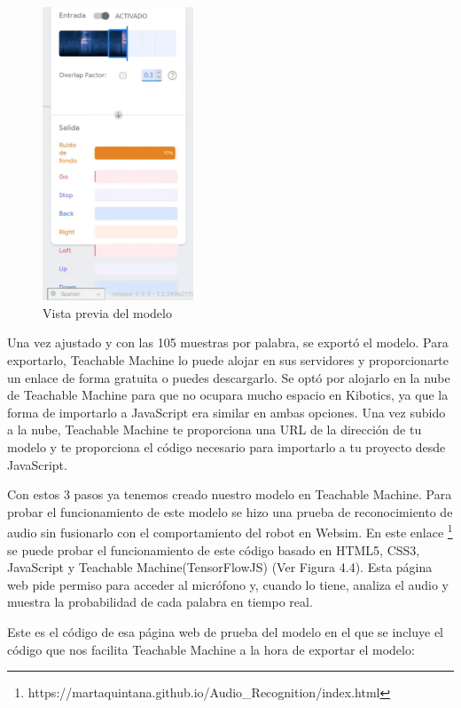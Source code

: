\begin{itemize}
\begin{figure}[H]
 \centering
    \includegraphics[width=0.4\textwidth, height=0.6\textwidth]{chapters/images/teachablemachine2.png}
    \caption{Vista previa del modelo}
\end{figure}
 

Una vez ajustado y con las 105 muestras por palabra, se exportó el modelo. 
Para exportarlo, Teachable Machine lo puede alojar en sus servidores y proporcionarte  un enlace de forma gratuita o puedes descargarlo. Se optó por alojarlo en la nube de Teachable Machine para que no ocupara mucho espacio en Kibotics, ya que la forma de importarlo  a JavaScript era similar en ambas opciones.
Una vez subido a la nube, Teachable Machine te proporciona una URL de la dirección de tu modelo y  te proporciona el código necesario para importarlo a tu proyecto desde JavaScript.
\end{itemize}

Con estos 3 pasos ya tenemos creado nuestro modelo en Teachable Machine. Para probar el funcionamiento de este modelo se hizo una prueba de reconocimiento de audio sin fusionarlo con el comportamiento del robot en Websim. En este enlace \footnote{https://martaquintana.github.io/Audio\_Recognition/index.html} se puede probar el funcionamiento de este código basado en HTML5, CSS3, JavaScript y Teachable Machine(TensorFlowJS) (Ver Figura 4.4). Esta página web pide permiso para acceder al micrófono y, cuando lo tiene, analiza el audio  y muestra la probabilidad de cada palabra en tiempo real.  

Este es el código de esa página web de prueba del modelo en el que se incluye el código que nos facilita Teachable Machine a la hora de exportar el modelo:

